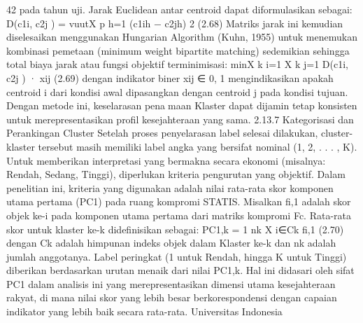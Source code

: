 42
pada tahun uji. Jarak Euclidean antar centroid dapat diformulasikan sebagai:
D(c1i, c2j ) =
vuutX
p
h=1
(c1ih − c2jh)
2
(2.68)
Matriks jarak ini kemudian diselesaikan menggunakan Hungarian Algorithm (Kuhn,
1955) untuk menemukan kombinasi pemetaan (minimum weight bipartite matching)
sedemikian sehingga total biaya jarak atau fungsi objektif terminimisasi:
minX
k
i=1
X
k
j=1
D(c1i, c2j ) · xij (2.69)
dengan indikator biner xij ∈ {0, 1} mengindikasikan apakah centroid i dari kondisi awal
dipasangkan dengan centroid j pada kondisi tujuan. Dengan metode ini, keselarasan penamaan Klaster dapat dijamin tetap konsisten untuk merepresentasikan profil kesejahteraan
yang sama.
2.13.7 Kategorisasi dan Perankingan Cluster
Setelah proses penyelarasan label selesai dilakukan, cluster-klaster tersebut masih
memiliki label angka yang bersifat nominal (1, 2, . . . , K). Untuk memberikan interpretasi
yang bermakna secara ekonomi (misalnya: Rendah, Sedang, Tinggi), diperlukan kriteria
pengurutan yang objektif. Dalam penelitian ini, kriteria yang digunakan adalah nilai
rata-rata skor komponen utama pertama (PC1) pada ruang kompromi STATIS.
Misalkan fi,1 adalah skor objek ke-i pada komponen utama pertama dari matriks
kompromi Fc. Rata-rata skor untuk klaster ke-k didefinisikan sebagai:
PC1,k =
1
nk
X
i∈Ck
fi,1 (2.70)
dengan Ck adalah himpunan indeks objek dalam Klaster ke-k dan nk adalah jumlah
anggotanya. Label peringkat (1 untuk Rendah, hingga K untuk Tinggi) diberikan
berdasarkan urutan menaik dari nilai PC1,k. Hal ini didasari oleh sifat PC1 dalam analisis
ini yang merepresentasikan dimensi utama kesejahteraan rakyat, di mana nilai skor yang
lebih besar berkorespondensi dengan capaian indikator yang lebih baik secara rata-rata.
Universitas Indonesia

